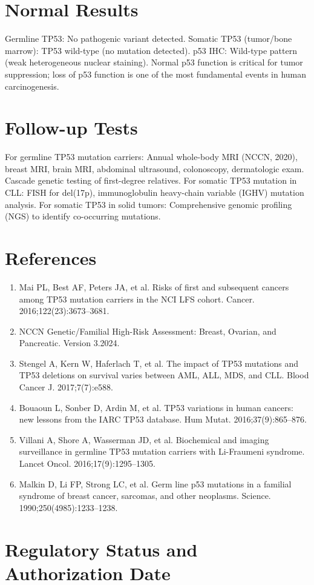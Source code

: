 \section*{Normal Results}
Germline TP53: No pathogenic variant detected. Somatic TP53 (tumor/bone marrow): TP53 wild-type (no mutation detected). p53 IHC: Wild-type pattern (weak heterogeneous nuclear staining). Normal p53 function is critical for tumor suppression; loss of p53 function is one of the most fundamental events in human carcinogenesis.

\section*{Follow-up Tests}
For germline TP53 mutation carriers: Annual whole-body MRI (NCCN, 2020), breast MRI, brain MRI, abdominal ultrasound, colonoscopy, dermatologic exam. Cascade genetic testing of first-degree relatives. For somatic TP53 mutation in CLL: FISH for del(17p), immunoglobulin heavy-chain variable (IGHV) mutation analysis. For somatic TP53 in solid tumors: Comprehensive genomic profiling (NGS) to identify co-occurring mutations.

\section*{References}
\begin{enumerate}
  \item Mai PL, Best AF, Peters JA, et al. Risks of first and subsequent cancers among TP53 mutation carriers in the NCI LFS cohort. Cancer. 2016;122(23):3673--3681.
  \item NCCN Genetic/Familial High-Risk Assessment: Breast, Ovarian, and Pancreatic. Version 3.2024.
  \item Stengel A, Kern W, Haferlach T, et al. The impact of TP53 mutations and TP53 deletions on survival varies between AML, ALL, MDS, and CLL. Blood Cancer J. 2017;7(7):e588.
  \item Bouaoun L, Sonber D, Ardin M, et al. TP53 variations in human cancers: new lessons from the IARC TP53 database. Hum Mutat. 2016;37(9):865--876.
  \item Villani A, Shore A, Wasserman JD, et al. Biochemical and imaging surveillance in germline TP53 mutation carriers with Li-Fraumeni syndrome. Lancet Oncol. 2016;17(9):1295--1305.
  \item Malkin D, Li FP, Strong LC, et al. Germ line p53 mutations in a familial syndrome of breast cancer, sarcomas, and other neoplasms. Science. 1990;250(4985):1233--1238.
\end{enumerate}

\clearpage
\section*{Regulatory Status and Authorization Date}

\clearpage
